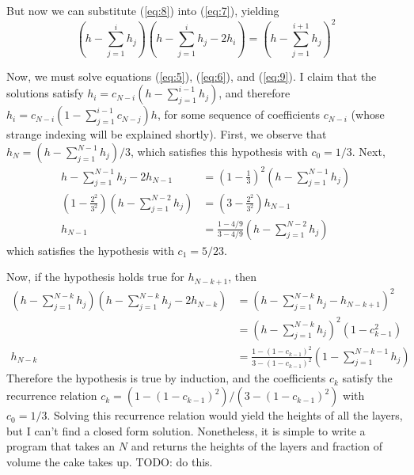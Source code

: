\documentclass[12pt]{article}
\begin{document}
But now we can substitute (\ref{eq:8}) into (\ref{eq:7}), yielding
\begin{equation}
  \label{eq:9}
  \left( h - \sum_{j=1}^i h_j \right) \left( h - \sum_{j=1}^i h_j - 2h_i \right) = \left( h - \sum_{j=1}^{i+1}h_j \right)^2
\end{equation}

Now, we must solve equations (\ref{eq:5}), (\ref{eq:6}), and (\ref{eq:9}). I claim that the solutions satisfy $h_i = c_{N-i}(h - \sum_{j=1}^{i-1}h_j)$, and therefore $h_i = c_{N-i}(1 - \sum_{j=1}^{i-1}c_{N-j})h$, for some sequence of coefficients $c_{N-i}$ (whose strange indexing will be explained shortly). First, we observe that $h_N = (h - \sum_{j=1}^{N-1}h_j)/3$, which satisfies this hypothesis with $c_0 = 1/3$. Next,
\begin{align*}
  h - \sum_{j=1}^{N-1}h_j - 2h_{N-1} &= \left( 1 - \frac{1}{3} \right)^2 \left( h - \sum_{j=1}^{N-1}h_j \right) \\
  \left( 1 - \frac{2^2}{3^2} \right)\left( h - \sum_{j=1}^{N-2}h_j \right) &= \left( 3 - \frac{2^2}{3^2} \right)h_{N-1}\\
  h_{N-1} &= \frac{1 - 4/9}{3-4/9} \left( h - \sum_{j=1}^{N-2}h_j \right)
\end{align*}
which satisfies the hypothesis with $c_1 = 5/23$.

Now, if the hypothesis holds true for $h_{N-k+1}$, then
\begin{align*}
  \left( h - \sum_{j=1}^{N-k}h_j \right) \left( h - \sum_{j=1}^{N-k}h_j - 2h_{N-k} \right) &= \left( h - \sum_{j=1}^{N-k}h_j - h_{N-k+1} \right)^2 \\
                                                                                           &= \left( h - \sum_{j=1}^{N-k}h_j \right)^2 \left( 1 - c_{k-1}^2 \right)\\
  h_{N-k} &= \frac{1 - (1-c_{k-1})^2}{3-(1-c_{k-1})^2}\left( 1 - \sum_{j=1}^{N-k-1}h_j \right)
\end{align*}
Therefore the hypothesis is true by induction, and the coefficients $c_k$ satisfy the recurrence relation $c_k = (1-(1-c_{k-1})^2)/(3-(1-c_{k-1})^2)$ with $c_0 = 1/3$. Solving this recurrence relation would yield the heights of all the layers, but I can't find a closed form solution. Nonetheless, it is simple to write a program that takes an $N$ and returns the heights of the layers and fraction of volume the cake takes up. TODO: do this.
\end{document}
